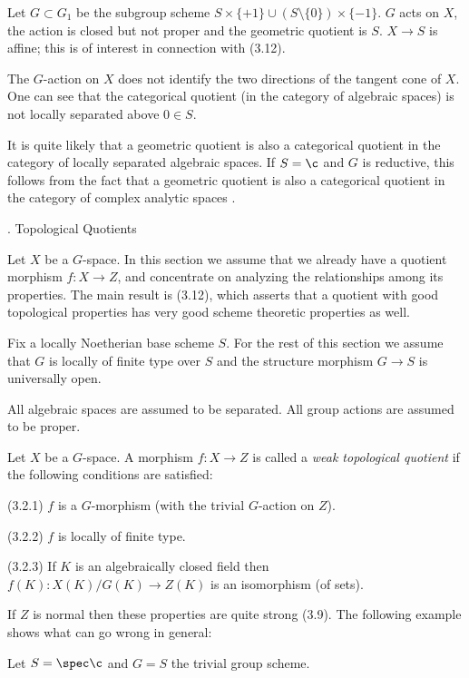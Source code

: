 Let $G\subset G_1$ be the subgroup scheme $S\times \{+1\}\cup
(S\setminus\{0\}) \times
\{-1\}$. $G$ acts on $X$, the action is closed but not proper and the
geometric quotient is $S$. $X\to S$ is affine; this is of interest in
connection with (3.12).

The $G$-action on $X$ does not identify the two directions of the tangent
cone of $X$. One can see that the categorical quotient (in the category of
algebraic spaces) is not locally separated above $0\in S$.
\enddemo

 It is quite likely that a geometric quotient is also a
categorical  quotient  in the category  of locally separated algebraic spaces.
If  $S=\c$ and $G$ is reductive,   this follows from the fact that a geometric
quotient is also a categorical  quotient  in the category of complex analytic
spaces
\cite{Neeman89, Thm. 10}.
\enddemo



. Topological Quotients
\endhead


Let $X$ be a $G$-space.   In this
section  we assume that we already have a quotient morphism $f:X\to Z$, and
concentrate on analyzing the relationships among its properties.   The main
result is (3.12), which asserts that a quotient with good topological
properties has very good scheme theoretic properties as well.

 Fix a locally Noetherian base scheme $S$. For the rest
of this section we assume that
$G$ is  locally of finite type over $S$ and the structure morphism $G\to S$ is
universally open.

All algebraic spaces are assumed to be separated. All group
actions are assumed to be proper.
\enddemo


 Let $X$ be a $G$-space. A morphism $f:X\to Z$ is
called a {\it weak  topological quotient} if the following conditions are
satisfied:

(3.2.1) $f$ is a $G$-morphism (with the trivial $G$-action on $Z$).

(3.2.2) $f$ is locally of finite type.

(3.2.3) If $K$ is  an algebraically closed field then
$f(K):X(K)/G(K)\to Z(K)$ is an isomorphism (of sets).
\enddemo

If $Z$ is normal then these properties are quite strong (3.9).
The
following example shows  what can go wrong in general:

  Let $S=\spec \c$ and $G=S$  the trivial group scheme.

